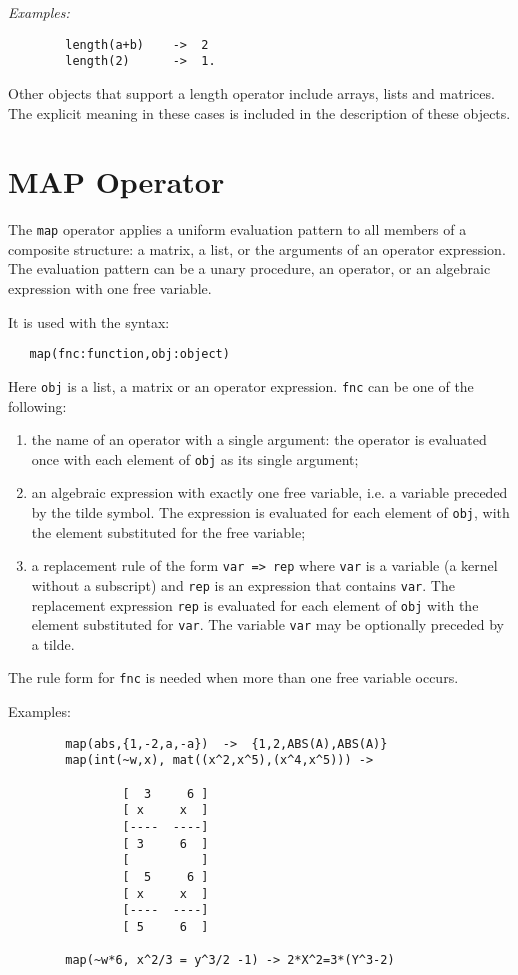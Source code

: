 \textit{Examples:}
\begin{verbatim}
        length(a+b)    ->  2
        length(2)      ->  1.
\end{verbatim}
Other objects that support a length operator include arrays, lists and
matrices. The explicit meaning in these cases is included in the description
of these objects.



\section{MAP Operator}
\hypertarget{operator:MAP}{}

The \texttt{map} operator applies a uniform evaluation pattern to all members
of a composite structure: a matrix, a list, or the arguments of an
operator expression.  The evaluation pattern can be a unary procedure, an
operator, or an algebraic expression with one free variable.

It is used with the syntax:
\begin{verbatim}
   map(fnc:function,obj:object)
\end{verbatim}
Here \texttt{obj} is a list, a matrix or an operator expression.
\texttt{fnc} can be one of the following:
\begin{enumerate}
\item the name of an operator with a single argument: the operator
is evaluated once with each element of \texttt{obj} as its single argument;
\item an algebraic expression with exactly one free variable, i.e.
a variable preceded by the tilde symbol. The expression
is evaluated for each element of \texttt{obj}, with the element
substituted for the free variable;
\item a replacement rule of the form \texttt{var => rep}
where \texttt{var} is a variable (a kernel without a subscript)
and \texttt{rep} is an expression that contains \texttt{var}.
The replacement expression \texttt{rep} is evaluated for each element of
\texttt{obj} with
the element substituted for  \texttt{var}. The variable \texttt{var} may be
optionally preceded by a tilde.
\end{enumerate}
The rule form  for \texttt{fnc} is needed when more than
one free variable occurs.

Examples:
\begin{verbatim}
        map(abs,{1,-2,a,-a})  ->  {1,2,ABS(A),ABS(A)}
        map(int(~w,x), mat((x^2,x^5),(x^4,x^5))) ->

                [  3     6 ]
                [ x     x  ]
                [----  ----]
                [ 3     6  ]
                [          ]
                [  5     6 ]
                [ x     x  ]
                [----  ----]
                [ 5     6  ]

        map(~w*6, x^2/3 = y^3/2 -1) -> 2*X^2=3*(Y^3-2)
\end{verbatim}


